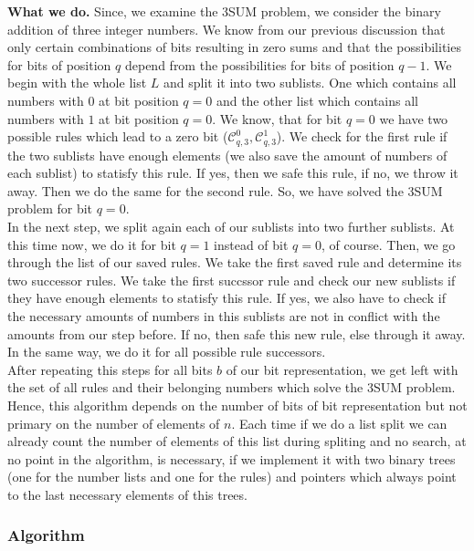 \documentclass{article}
\newtheorem*{theorem A}{Theorem A}
\newtheorem*{theorem B}{N\"olker's Theorem}
\theoremstyle{remark}
\theoremstyle{remark}
\begin{document}
\textbf{What we do.} Since, we examine the 3SUM problem, we consider the binary addition of three integer numbers. We know from our previous discussion that only certain combinations of bits resulting in zero sums and that the possibilities for bits of position $q$ depend from the possibilities for bits of position $q-1$. We begin with the whole list $L$ and split it into two sublists. One which contains all numbers with $0$ at bit position $q=0$ and the other list which contains all numbers with $1$ at bit position $q=0$. We know, that for bit $q=0$ we have two possible rules which lead to a zero bit ($\mathcal{C}^{0}_{q,3}, \mathcal{C}^{1}_{q,3}$). We check for the first rule if the two sublists have enough elements (we also save the amount of numbers of each sublist) to statisfy this rule. If yes, then we safe this rule, if no, we throw it away. Then we do the same for the second rule. So, we have solved the 3SUM problem for bit $q = 0$.\\
In the next step, we split again each of our sublists into two further sublists. At this time now, we do it for bit $q = 1$ instead of bit $q = 0$, of course. Then, we go through the list of our saved rules. We take the first saved rule and determine its two successor rules. We take the first succssor rule and check our new sublists if they have enough elements to statisfy this rule. If yes, we also have to check if the necessary amounts of numbers in this sublists are not in conflict with the amounts from our step before. If no, then safe this new rule, else through it away. In the same way, we do it for all possible rule successors.\\
After repeating this steps for all bits $b$ of our bit representation, we get left with the set of all rules and their belonging numbers which solve the 3SUM problem.\\
Hence, this algorithm depends on the number of bits of bit representation but not primary on the number of elements of $n$. Each time if we do a list split we can already count the number of elements of this list during spliting and no search, at no point in the algorithm, is necessary, if we implement it with two binary trees (one for the number lists and one for the rules) and pointers which always point to the last necessary elements of this trees.
\subsubsection{Algorithm}
\label{sss:algorithm}
\end{document}
